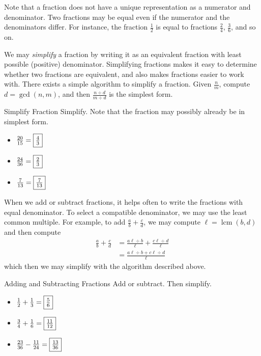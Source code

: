 \documentclass[a4paper,10pt]{report}
\begin{document}
Note that a fraction does not have a unique representation as a numerator and
denominator. Two fractions may be equal even if the numerator and the
denominators differ. For instance, the fraction \(\frac{1}{2}\) is equal to
fractions \(\frac{2}{4}\), \(\frac{3}{6}\), and so on.

We may \emph{simplify} a fraction by writing it as an equivalent fraction with
least possible (positive) denominator. Simplifying fractions makes it easy to
determine whether two fractions are equivalent, and also makes fractions easier
to work with. There exists a simple algorithm to simplify a fraction. Given
\(\frac{n}{m}\), compute \(d=\gcd(n, m)\), and then \(\frac{n\div d}{m\div d}\)
is the simplest form.

\begin{problem}{Simplify Fraction}
 Simplify. Note that the fraction may possibly already be in simplest form.

 \begin{itemize}
  \item \(\frac{20}{15}=\Ans{\frac{4}{3}}\)
  \item \(\frac{24}{36}=\Ans{\frac{2}{3}}\)
  \item \(\frac{7}{13}=\Ans{\frac{7}{13}}\)
 \end{itemize}
\end{problem}

When we add or subtract fractions, it helps often to write the fractions with
equal denominator. To select a compatible denominator, we may use the least
common multiple. For example, to add \(\frac{a}{b}+\frac{c}{d}\), we may
compute \(\ell=\operatorname{lcm}(b, d)\) and then compute \begin{align*}
 \frac{a}{b}+\frac{c}{d}
 &= \frac{a\ell\div b}{\ell} + \frac{c\ell\div d}{\ell} \\
 &= \frac{a\ell\div b + c\ell\div d}{\ell}
\end{align*} which then we may simplify with the algorithm described above.

\begin{problem}{Adding and Subtracting Fractions}
 Add or subtract. Then simplify.

 \begin{itemize}
  \item \(\frac{1}{2} + \frac{1}{3} = \Ans{\frac{5}{6}}\)
  \item \(\frac{3}{4} + \frac{1}{6} = \Ans{\frac{11}{12}}\)
  \item \(\frac{23}{36} - \frac{11}{24} = \Ans{\frac{13}{36}}\)
 \end{itemize}
\end{problem}
\end{document}
